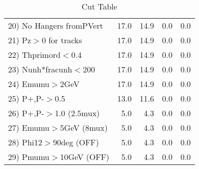 \begin{table}[h!]
\begin{tabular}{||l||r|r|r|r||}
 20) No Hangers fromPVert &        17.0 &        14.9 &         0.0 &         0.0 \\
 21) Pz$>$0 for tracks    &        17.0 &        14.9 &         0.0 &         0.0 \\
 22) Thprimord$<$0.4      &        17.0 &        14.9 &         0.0 &         0.0 \\
 23) Nunh*fracunh$<$200   &        17.0 &        14.9 &         0.0 &         0.0 \\
 24) Emumu$>$2GeV         &        17.0 &        14.9 &         0.0 &         0.0 \\
 25) P+,P-$>$0.5          &        13.0 &        11.6 &         0.0 &         0.0 \\
 26) P+,P-$>$1.0 (2.5mux) &         5.0 &         4.3 &         0.0 &         0.0 \\
 27) Emumu$>$5GeV  (8mux) &         5.0 &         4.3 &         0.0 &         0.0 \\
 28) Phi12$>$90deg  (OFF) &         5.0 &         4.3 &         0.0 &         0.0 \\
 29) Pmumu$>$10GeV  (OFF) &         5.0 &         4.3 &         0.0 &         0.0 \\
 \hline
 \hline
 \end{tabular}
 \caption{Cut Table \cohjp  }
 \label{tab-cut__jpsi}
 \end{table}
